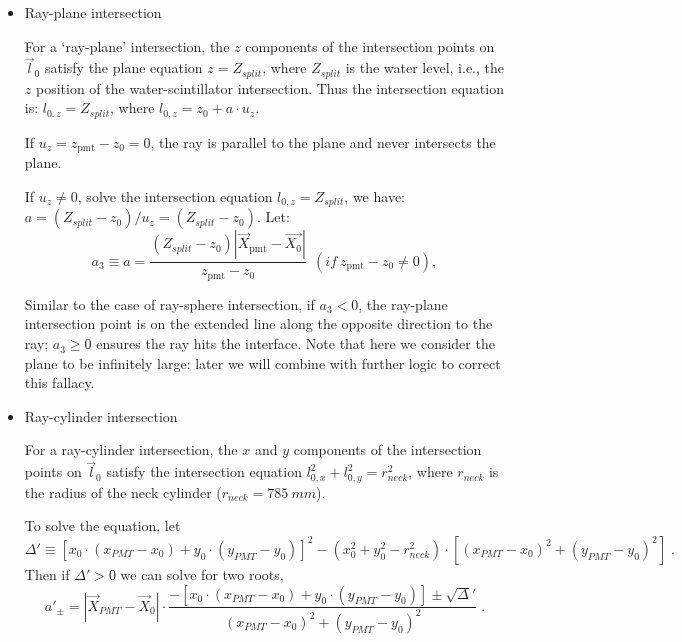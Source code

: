 \begin{itemize}
\item Ray-plane intersection

For a `ray-plane' intersection, the $z$ components of the intersection points on $\vec{l}_0$ satisfy the plane equation $z=Z_{split}$, where $Z_{split}$ is the water level, i.e., the $z$ position of the water-scintillator intersection. Thus the intersection equation is:
$l_{0,z}=Z_{split}$, where $l_{0,z}=z_0+a\cdot u_z$.

If $u_z=z_\mathrm{pmt}-z_0=0$, the ray is parallel to the plane and never intersects the plane.

If $u_z\neq 0$, solve the intersection equation $l_{0,z}=Z_{split}$, we have: $a=(Z_{split}-z_0)/u_z=(Z_{split}-z_0)$.
Let: 
\begin{equation}
a_3 \equiv a = \frac{(Z_{split}-z_0)|\vec{X}_{\mathrm{pmt}}-\vec{X_0}|}{z_\mathrm{pmt}-z_0}~~(if ~z_\mathrm{pmt}-z_0\neq 0),
\end{equation}

Similar to the case of ray-sphere intersection, if $a_3<0$, the ray-plane intersection point is on the extended line along the opposite direction to the ray; $a_3 \geq 0$ ensures the ray hits the interface. Note that here we consider the plane to be infinitely large: later we will combine with further logic to correct this fallacy. 

\item Ray-cylinder intersection

For a ray-cylinder intersection, the $x$ and $y$ components of the intersection points on $\vec l_0$ satisfy the intersection equation $l^2_{0,x}+l^2_{0,y} = r^2_{neck}$, where $r_{neck}$ is the radius of the neck cylinder ($r_{neck}=785~mm$).

To solve the equation, let 
\begin{equation*}
\Delta'\equiv [x_0\cdot (x_{PMT}-x_0)+y_0\cdot(y_{PMT}-y_0)]^2 - ( x_0^2+y_0^2-r^2_{neck})\cdot [(x_{PMT}-x_0)^2+(y_{PMT}-y_0)^2] \; . 
\end{equation*}
Then if $\Delta'>0$ we can solve for two roots, 
\begin{equation}\label{eq:ray-cylinder}
a'_{\pm} = |\vec{X}_{PMT}-\vec{X}_0|\cdot\frac{-[x_0\cdot (x_{PMT}-x_0)+y_0\cdot(y_{PMT}-y_0)] \pm \sqrt\Delta' }{(x_{PMT}-x_0)^2+(y_{PMT}-y_0)^2} \; .
\end{equation}


\end{itemize}
